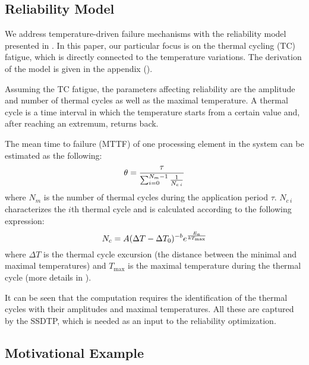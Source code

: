 \subsection{Reliability Model} 

We address temperature-driven failure mechanisms with the reliability model
presented in \cite{huang2009, xiang2010}. In this paper, our particular focus is
on the thermal cycling (TC) fatigue, which is directly connected to the
temperature variations. The derivation of the model is given in the appendix
().

Assuming the TC fatigue, the parameters affecting reliability are the amplitude
and number of thermal cycles as well as the maximal temperature. A thermal cycle
is a time interval in which the temperature starts from a certain value and,
after reaching an extremum, returns back.

The mean time to failure (MTTF) of one processing element in the system can be
estimated as the following:
\begin{align} \elab{one-mttf}
  \theta = \frac{\tau}{\sum_{i=0}^{N_m - 1} \frac{1}{N_{c \: i}}}
\end{align}
where $N_m$ is the number of thermal cycles during the application period
$\tau$. $N_{c \: i}$ characterizes the $i$th thermal cycle and is calculated
according to the following expression:
\begin{equation} \elab{cycles-to-failure}
  N_c = A (\Delta T - \Delta T_0)^{-b} e^{\frac{E_a}{k T_\text{max}}}
\end{equation}
where $\Delta T$ is the thermal cycle excursion (the distance between the
minimal and maximal temperatures) and $T_\text{max}$ is the maximal temperature
during the thermal cycle (more details in ).

It can be seen that the computation requires the identification of the thermal
cycles with their amplitudes and maximal temperatures. All these are captured by
the SSDTP, which is needed as an input to the reliability optimization.

\subsection{Motivational Example}

